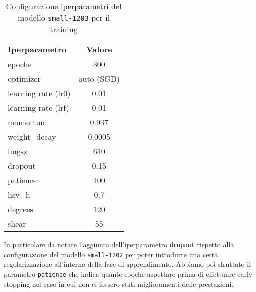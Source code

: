 \begin{table}[h!]
    \centering
    \begin{tabular}{lc}
        \hline
        \textbf{Iperparametro} & \textbf{Valore} \\
        \hline
        epoche & 300  \\
        optimizer & auto (SGD) \\
        learning rate (lr0) & 0.01 \\
        learning rate (lrf) & 0.01 \\
        momentum & 0.937 \\
        weight\_decay & 0.0005 \\
        imgsz & 640 \\
        dropout & 0.15 \\
        patience & 100 \\
        \midrule
        hsv\_h & 0.7 \\
        degrees & 120 \\
        shear & 55 \\
        \hline
    \end{tabular}
    \caption{Configurazione iperparametri del modello \texttt{small-1203} per il training}
    \label{tab:v2-model-configs}
    \end{table}

In particolare da notare l'aggiunta dell'iperparametro \texttt{dropout} rispetto alla configurazione
del modello \texttt{small-1202} per poter introdurre una certa regolarizzazione all'interno della fase
di apprendimento. 
Abbiamo poi sfruttato il parametro \texttt{patience} che indica quante epoche aspettare
prima di effettuare early stopping nel caso in cui non ci fossero stati miglioramenti delle prestazioni.

